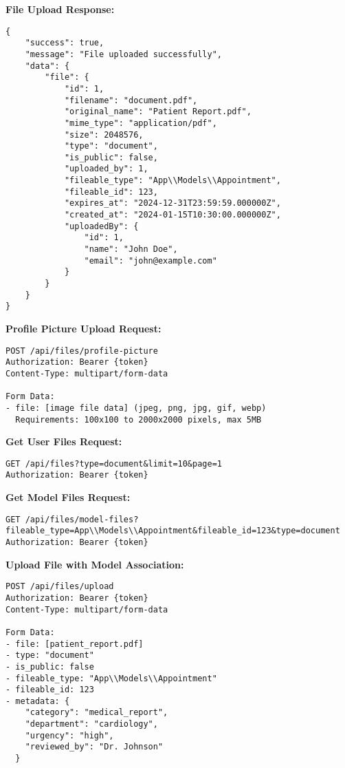 \documentclass[12pt,a4paper]{article}
\begin{document}
\textbf{File Upload Response:}
\begin{lstlisting}
{
    "success": true,
    "message": "File uploaded successfully",
    "data": {
        "file": {
            "id": 1,
            "filename": "document.pdf",
            "original_name": "Patient Report.pdf",
            "mime_type": "application/pdf",
            "size": 2048576,
            "type": "document",
            "is_public": false,
            "uploaded_by": 1,
            "fileable_type": "App\\Models\\Appointment",
            "fileable_id": 123,
            "expires_at": "2024-12-31T23:59:59.000000Z",
            "created_at": "2024-01-15T10:30:00.000000Z",
            "uploadedBy": {
                "id": 1,
                "name": "John Doe",
                "email": "john@example.com"
            }
        }
    }
}
\end{lstlisting}

\textbf{Profile Picture Upload Request:}
\begin{lstlisting}
POST /api/files/profile-picture
Authorization: Bearer {token}
Content-Type: multipart/form-data

Form Data:
- file: [image file data] (jpeg, png, jpg, gif, webp)
  Requirements: 100x100 to 2000x2000 pixels, max 5MB
\end{lstlisting}

\textbf{Get User Files Request:}
\begin{lstlisting}
GET /api/files?type=document&limit=10&page=1
Authorization: Bearer {token}
\end{lstlisting}

\textbf{Get Model Files Request:}
\begin{lstlisting}
GET /api/files/model-files?fileable_type=App\\Models\\Appointment&fileable_id=123&type=document
Authorization: Bearer {token}
\end{lstlisting}

\textbf{Upload File with Model Association:}
\begin{lstlisting}
POST /api/files/upload
Authorization: Bearer {token}
Content-Type: multipart/form-data

Form Data:
- file: [patient_report.pdf]
- type: "document"
- is_public: false
- fileable_type: "App\\Models\\Appointment"
- fileable_id: 123
- metadata: {
    "category": "medical_report",
    "department": "cardiology",
    "urgency": "high",
    "reviewed_by": "Dr. Johnson"
  }
\end{lstlisting}
\end{document}

